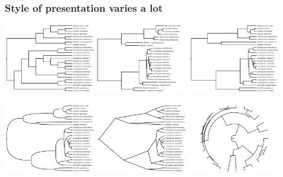 \begin{frame}
    \frametitle{Style of presentation varies a lot}
    \begin{center}
        \includegraphics[width=0.3\textwidth]{../images/crocodylia-species-tree-cladogram.pdf}
        \hspace{2mm}
        \includegraphics[width=0.3\textwidth]{../images/crocodylia-ml.pdf}
        \hspace{2mm}
        \includegraphics[width=0.3\textwidth]{../images/crocodylia-species-tree-square.pdf}

        \vspace{0.5cm}
        \includegraphics[width=0.3\textwidth]{../images/crocodylia-species-tree-round.pdf}
        \hspace{2mm}
        \includegraphics[width=0.3\textwidth]{../images/crocodylia-species-tree-triangle.pdf}
        \hspace{2mm}
        \includegraphics[width=0.3\textwidth]{../images/crocodylia-species-tree-circle.pdf}
    \end{center}
\end{frame}


